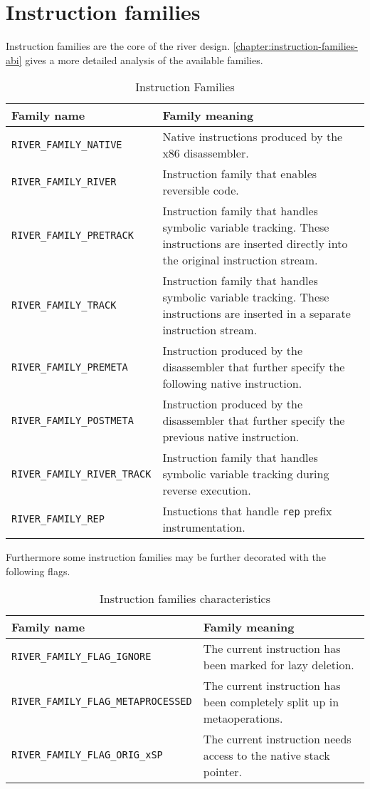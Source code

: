 \documentclass[12pt]{report}
\begin{document}
\section{Instruction families}
\label{sec:instrfamilies}
Instruction families are the core of the river design. \autoref{chapter:instruction-families-abi} gives a more detailed analysis of the available families.\\
\begin{table}[H]
	\begin{tabular}{| p{6cm} | p{10cm} |}
		\hline
		\textbf{Family name} & \textbf{Family meaning}\\ \hline
		\texttt{RIVER_FAMILY_NATIVE} & Native instructions produced by the x86 disassembler.\\ \hline
		\texttt{RIVER_FAMILY_RIVER} & Instruction family that enables reversible code.\\ \hline
		\texttt{RIVER_FAMILY_PRETRACK} & Instruction family that handles symbolic variable tracking. These instructions are inserted directly into the original instruction stream.\\ \hline
		\texttt{RIVER_FAMILY_TRACK} & Instruction family that handles symbolic variable tracking. These instructions are inserted in a separate instruction stream.\\ \hline
		\texttt{RIVER_FAMILY_PREMETA} & Instruction produced by the disassembler that further specify the following native instruction.\\ \hline
		\texttt{RIVER_FAMILY_POSTMETA} & Instruction produced by the disassembler that further specify the previous native instruction.\\ \hline
		\texttt{RIVER_FAMILY_RIVER_TRACK} & Instruction family that handles symbolic variable tracking during reverse execution.\\ \hline
		\texttt{RIVER_FAMILY_REP} & Instuctions that handle \texttt{rep} prefix instrumentation.\\ \hline
	\end{tabular}
	\caption{Instruction Families}
	\label{table:instruction-families}
\end{table}
Furthermore some instruction families may be further decorated with the following flags.\\
\begin{table}[H]
	\begin{tabular}{| p{8cm} | p{8cm} |}
		\hline
		\textbf{Family name} & \textbf{Family meaning}\\ \hline
		\texttt{RIVER_FAMILY_FLAG_IGNORE} & The current instruction has been marked for lazy deletion.\\ \hline
		\texttt{RIVER_FAMILY_FLAG_METAPROCESSED} & The current instruction has been completely split up in metaoperations.\\ \hline
		\texttt{RIVER_FAMILY_FLAG_ORIG_xSP} & The current instruction needs access to the native stack pointer.\\ \hline
	\end{tabular}
	\caption{Instruction families characteristics}
\end{table}
\end{document}
